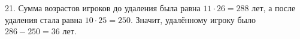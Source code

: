 21. Сумма возрастов игроков до удаления была равна $11\cdot26=288$ лет, а после удаления стала равна $10\cdot25=250.$ Значит, удалённому игроку было $286-250=36$ лет.\\
